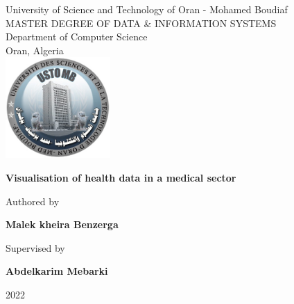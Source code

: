 \begin{titlepage}
    \begin{center}
        University of Science and Technology of Oran - Mohamed Boudiaf\\
        MASTER DEGREE OF DATA \& INFORMATION SYSTEMS\\
        Department of Computer Science\\
        Oran, Algeria\\
        \vspace*{0.5cm}
        \includegraphics[width=0.3\textwidth]{images/others/usto.jpg}
        \vspace{1cm}
 
        {\large
        \textbf{Visualisation of health data in a medical sector}}
 
        \vspace{1cm}
        Authored by
             
        \vspace{0.5cm}
 
        \textbf{Malek kheira Benzerga}


        \vspace{0.5cm}
         Supervised by
             
        \vspace{0.5cm}
 
        \textbf{Abdelkarim Mebarki}
 
        \vfill
             
        
        \vspace{0.8cm}
    
         
        \vspace{0.5cm}
        
        2022
             
    \end{center}
 \end{titlepage}